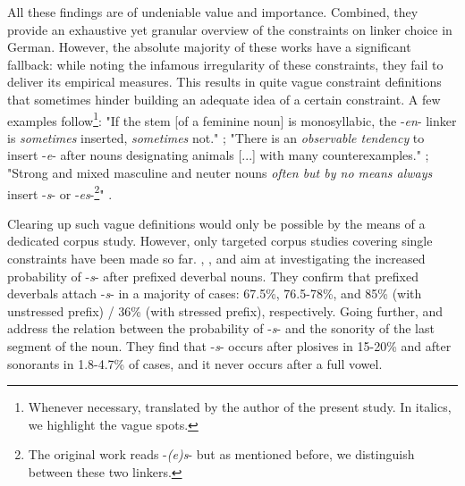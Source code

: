 \documentclass[10pt, a4paper]{article}
\begin{document}
All these findings are of undeniable value and importance. Combined, they provide an exhaustive yet granular overview of the constraints on linker choice in German. However, the absolute majority of these works have a significant fallback: while noting the infamous irregularity of these constraints, they fail to deliver its empirical measures. This results in quite vague constraint definitions that sometimes hinder building an adequate idea of a certain constraint. A few examples follow\footnote{Whenever necessary, translated by the author of the present study. In italics, we highlight the vague spots.}: "If the stem [of a feminine noun] is monosyllabic, the -\textit{en}- linker is \textit{sometimes} inserted, \textit{sometimes} not." \citep[229]{eisenberg_2013}; "There is an \textit{observable tendency} to insert \mbox{-\textit{e}-} after nouns designating animals [...] with many counterexamples." \citep[11]{nuebling_szczepaniak_2008}; "Strong and mixed masculine and neuter nouns \textit{often but by no means always} insert \mbox{-\textit{s}-} or \mbox{-\textit{es}-}\footnote{The original work reads -\textit{(e)s}- but as mentioned before, we distinguish between these two linkers.}" \citep[229]{schaefer_2018}.

Clearing up such vague definitions would only be possible by the means of a dedicated corpus study. However, only targeted corpus studies covering single constraints have been made so far. \citet{kopf_2017}, \citet{kuerschner_2005}, and \citet{nuebling_szczepaniak_2008} aim at investigating the increased probability of \mbox{-\textit{s}-} after prefixed deverbal nouns. They confirm that prefixed deverbals attach \mbox{-\textit{s}-} in a majority of cases: 67.5\%, 76.5-78\%, and 85\% (with unstressed prefix) / 36\% (with stressed prefix), respectively. Going further, \citet{nuebling_szczepaniak_2008} and \citet{wegener_2005} address the relation between the probability of \mbox{-\textit{s}-} and the sonority of the last segment of the noun. They find that \mbox{-\textit{s}-} occurs after plosives in 15-20\% and after sonorants in 1.8-4.7\% of cases, and it never occurs after a full vowel.


\end{document}
